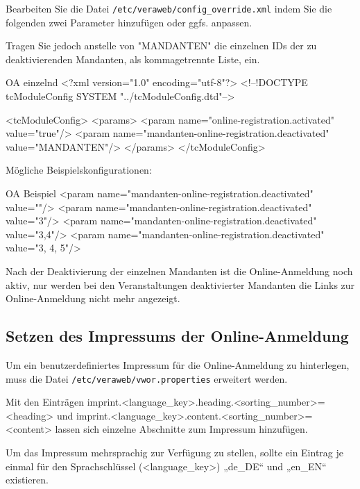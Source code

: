 \begin{minipage}{\linewidth}
Bearbeiten Sie die Datei \texttt{/etc/veraweb/config\_override.xml}
indem Sie die folgenden zwei Parameter hinzufügen oder ggfs. anpassen.

Tragen Sie jedoch anstelle von "MANDANTEN" die einzelnen IDs der zu
deaktivierenden Mandanten, als kommagetrennte Liste, ein.

\begin{lstdump}[language=XML]{OA einzelnd}
<?xml version="1.0" encoding="utf-8"?>
<!--!DOCTYPE tcModuleConfig SYSTEM "../tcModuleConfig.dtd"-->

<tcModuleConfig>
    <params>
        <param name="online-registration.activated" value="true"/>
        <param name="mandanten-online-registration.deactivated" value="MANDANTEN"/>
    </params>
</tcModuleConfig>
\end{lstdump}

Mögliche Beispielskonfigurationen:
\begin{lstdump}[language=XML]{OA Beispiel}
        <param name="mandanten-online-registration.deactivated" value=""/>
        <param name="mandanten-online-registration.deactivated" value="3"/>
        <param name="mandanten-online-registration.deactivated" value="3,4"/>
        <param name="mandanten-online-registration.deactivated" value="3, 4, 5"/>
\end{lstdump}
\end{minipage}

Nach der Deaktivierung der einzelnen Mandanten ist die Online-Anmeldung noch
aktiv, nur werden bei den Veranstaltungen deaktivierter Mandanten die Links
zur Online-Anmeldung nicht mehr angezeigt.

\subsection{Setzen des Impressums der Online-Anmeldung}\label{sec:imprint-oa}

Um ein benutzerdefiniertes Impressum für die Online-Anmeldung zu hinterlegen,
muss die Datei \texttt{/etc/veraweb/vwor.properties} erweitert werden.

Mit den Einträgen imprint.<language\_key>.heading.<sorting\_number>=<heading>
und imprint.<language\_key>.content.<sorting\_number>=<content>
lassen sich einzelne Abschnitte zum Impressum hinzufügen.

Um das Impressum mehrsprachig zur Verfügung zu stellen, sollte ein Eintrag je
einmal für den Sprachschlüssel (<language\_key>) „de\_DE“ und „en\_EN“ existieren.

